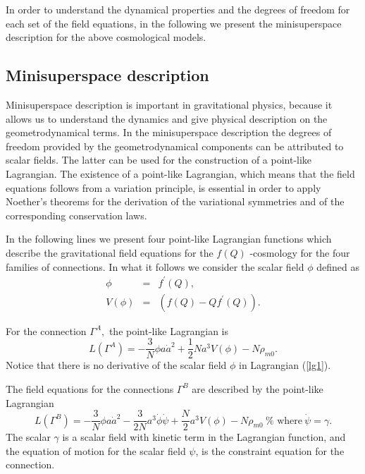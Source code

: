 \documentclass[onecolumn,superscriptaddress,secnumarabic,nobibnotes,aps,prd,nofootinbib,altaffilletter,11pt]{revtex4}
\begin{document}
In order to understand the dynamical properties and the degrees of freedom
for each set of the field equations, in the following we present the
minisuperspace description for the above cosmological models.

\subsection{Minisuperspace description}

Minisuperspace description is important in gravitational physics, because it
allows us to understand the dynamics and give physical description on the
geometrodynamical terms. In the minisuperspace description the degrees of
freedom provided by the geometrodynamical components can be attributed to
scalar fields. The latter can be used for the construction of a point-like
Lagrangian. The existence of a point-like Lagrangian, which means that the
field equations follows from a variation principle, is essential in order to apply Noether's theorems for the derivation of the variational symmetries
and of the corresponding conservation laws.

In the following lines we present four point-like Lagrangian functions which
describe the gravitational field equations for the $f\left( Q\right) $%
-cosmology for the four families of connections. In what it follows we
consider the scalar field $\phi $ defined as \cite{mini} 
\begin{eqnarray}
\phi &=&f^{\prime }\left( Q\right) ,~  \label{cl.1} \\
V\left( \phi \right) &=&\left( f(Q)-Qf^{\prime }(Q)\right) .  \label{cl.2}
\end{eqnarray}

For the connection $\Gamma ^{A},$ the point-like Lagrangian is %
\begin{equation}
L\left( \Gamma ^{A}\right) =-\frac{3}{N}\phi a\dot{a}^{2}+\frac{1}{2}%
Na^{3}V\left( \phi \right) -N\rho _{m0}\text{.}  \label{lg1}
\end{equation}%
Notice that there is no derivative of the scalar field $\phi$ in Lagrangian (\ref{lg1}). 

The field equations for the connections $\Gamma ^{B}$ are described by the
point-like Lagrangian %
\begin{equation}
L\left( \Gamma ^{B}\right) =-\frac{3}{N}\phi a\dot{a}^{2}-\frac{3}{2N}a^{3}%
\dot{\phi}\dot{\psi}+\frac{N}{2}a^{3}V\left( \phi \right) -N\rho _{m0}~\text{%
where}~\dot{\psi}=\gamma \text{.}  \label{lg2}
\end{equation}%
The scalar $\gamma $ is a scalar field with kinetic term in the Lagrangian
function, and the equation of motion for the scalar field $\psi $, is the
constraint equation for the connection.
\end{document}
